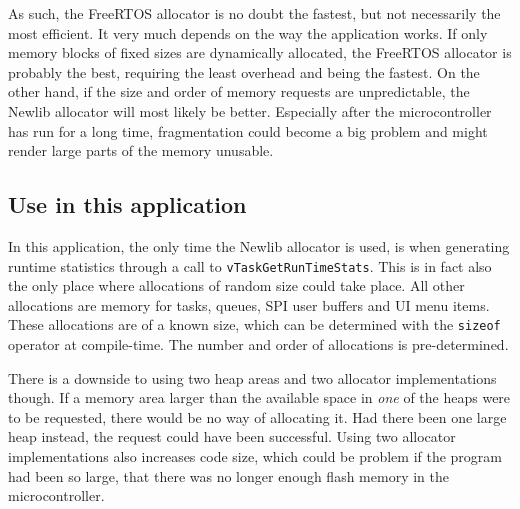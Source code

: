 As such, the FreeRTOS allocator is no doubt the fastest, but not necessarily the most efficient. It very much depends on the way the application works. If only memory blocks of fixed sizes are dynamically allocated, the FreeRTOS allocator is probably the best, requiring the least overhead and being the fastest. On the other hand, if the size and order of memory requests are unpredictable, the Newlib allocator will most likely be better. Especially after the microcontroller has run for a long time, fragmentation could become a big problem and might render large parts of the memory unusable.


\subsection{Use in this application}
In this application, the only time the Newlib allocator is used, is when generating runtime statistics through a call to \texttt{vTaskGetRunTimeStats}. This is in fact also the only place where allocations of random size could take place. All other allocations are memory for tasks, queues, SPI user buffers and UI menu items. These allocations are of a known size, which can be determined with the \texttt{sizeof} operator at compile-time. The number and order of allocations is pre-determined.

There is a downside to using two heap areas and two allocator implementations though. If a memory area larger than the available space in \textit{one} of the heaps were to be requested, there would be no way of allocating it. Had there been one large heap instead, the request could have been successful. Using two allocator implementations also increases code size, which could be problem if the program had been so large, that there was no longer enough flash memory in the microcontroller.

